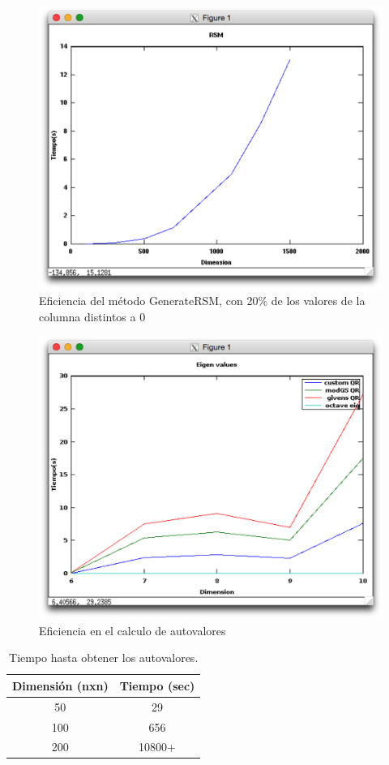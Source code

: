 \documentclass[a4paper,10pt,spanish]{article}
\begin{document}
\begin{figure}[!htb]
    \centering
    \includegraphics[width=120mm]{GenerateRSM.png} 
    \caption{Eficiencia del método GenerateRSM, con 20\% de los valores de la columna distintos a 0}
\end{figure}

\begin{figure}[!htb]
    \centering
    \includegraphics[width=120mm]{eig_comp.png}  
    \caption{Eficiencia en el calculo de autovalores}
\end{figure}

\begin{center}
\begin{table}[!htbp]
\centering
\begin{tabular}{cc}
\hline
\textbf{Dimensión (nxn)} & \textbf{Tiempo (sec)} \\ \hline
50											& 29								\\
100											& 656								\\
200											& 10800+							\\
\end{tabular}
\caption[Eficiencia en el calculo de autovalores] {Tiempo hasta obtener los autovalores.}
\end{table}
\end{center}
\end{document}
